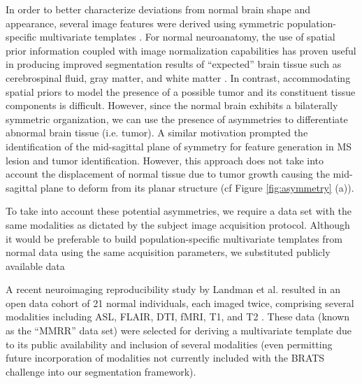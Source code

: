 \documentclass[final,5p,times,twocolumn]{elsarticle}
\begin{document}
In order to better characterize deviations from normal brain shape 
and appearance, several image features were derived using symmetric 
population-specific multivariate templates \citep{avants2008,avants2010}.  
For normal neuroanatomy, the use of spatial prior information 
coupled with image normalization capabilities has proven useful 
in producing improved segmentation results of ``expected'' brain tissue
such as cerebrospinal fluid, gray matter, and white matter 
\citep[e.g.,][]{ashburner1997}.  In contrast, accommodating spatial 
priors to model the presence of a possible tumor and its constituent tissue 
components is difficult. However, since the normal brain 
exhibits a bilaterally symmetric organization, we can 
use the presence of asymmetries to differentiate abnormal 
brain tissue (i.e. tumor).  A similar motivation prompted
the identification of the mid-sagittal plane of symmetry \citep{prima2002}
for feature generation in MS lesion \citep{geremia2011} and 
tumor \citep{geremia2012} identification.  However, this
approach does not take into account the displacement of 
normal tissue due to tumor growth causing the mid-sagittal plane
to deform from its planar structure (cf Figure \ref{fig:asymmetry} (a)).


To take into account these potential asymmetries, we 
require a data set with the same modalities as dictated
by the subject image acquisition protocol.  Although it
would be preferable to build population-specific multivariate
templates from normal data using the same acquisition 
parameters, we substituted publicly available data 

A recent neuroimaging reproducibility study
by Landman et al. resulted in an open data cohort of 21
normal individuals, each imaged twice, comprising several
modalities including ASL, FLAIR, DTI, fMRI, T1, and T2 
\citep{landman2011}.  These data (known as the
``MMRR'' data set) were selected for deriving
a multivariate template due to its public availability and
inclusion of several modalities (even permitting future 
incorporation of modalities 
not currently included with the BRATS challenge into our 
segmentation framework).  
\end{document}
